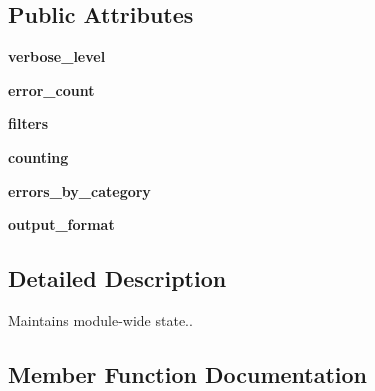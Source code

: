 \subsection*{Public Attributes}
\begin{DoxyCompactItemize}
\item 
\mbox{\label{classcpp__lint_1_1___cpp_lint_state_a9fa716fbebb66b726411c9538535bff7}} 
{\bfseries verbose\+\_\+level}
\item 
\mbox{\label{classcpp__lint_1_1___cpp_lint_state_ad210f2bd70461e1b62eb614f8d389486}} 
{\bfseries error\+\_\+count}
\item 
\mbox{\label{classcpp__lint_1_1___cpp_lint_state_a5a904066dea9e48d4e1a0dbb2d61824b}} 
{\bfseries filters}
\item 
\mbox{\label{classcpp__lint_1_1___cpp_lint_state_ad557deaee4ec6e414c521f8c47889c1e}} 
{\bfseries counting}
\item 
\mbox{\label{classcpp__lint_1_1___cpp_lint_state_af33b9daa46454c53d370eca6b2bca107}} 
{\bfseries errors\+\_\+by\+\_\+category}
\item 
\mbox{\label{classcpp__lint_1_1___cpp_lint_state_a4df79633cd7c67c7253523b54f7c57ce}} 
{\bfseries output\+\_\+format}
\end{DoxyCompactItemize}


\subsection{Detailed Description}
\begin{DoxyVerb}Maintains module-wide state..\end{DoxyVerb}
 

\subsection{Member Function Documentation}
\mbox{\label{classcpp__lint_1_1___cpp_lint_state_a639dac461e7354dcec4b629195758852}} 
